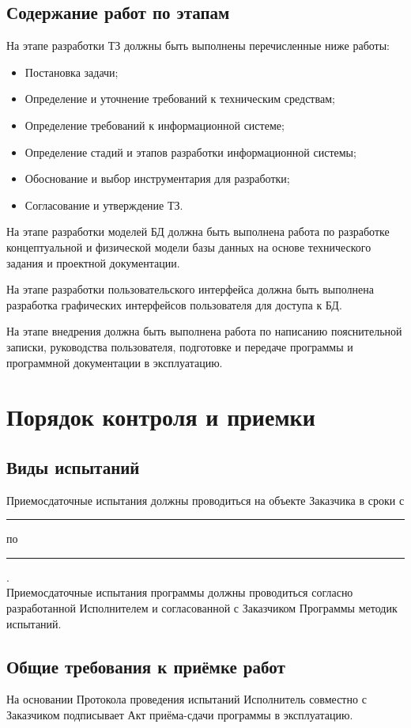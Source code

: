   \subsection{Содержание работ по этапам}
    На этапе разработки ТЗ должны быть выполнены перечисленные ниже работы:
      \begin{itemize}
        \item Постановка задачи;
        \item Определение и уточнение требований к техническим средствам;
        \item Определение требований к информационной системе;
        \item Определение стадий и этапов разработки информационной системы;
        \item Обоснование и выбор инструментария для разработки;
        \item Согласование и утверждение ТЗ.
      \end{itemize}
        
    На этапе разработки моделей БД должна быть выполнена работа по разработке концептуальной и физической модели базы данных на основе технического задания и проектной документации.

    На этапе разработки пользовательского интерфейса должна быть выполнена разработка графических интерфейсов пользователя для доступа к БД.

    На этапе внедрения должна быть выполнена работа по написанию пояснительной записки, руководства пользователя, подготовке и передаче программы и программной документации в эксплуатацию.
\section{Порядок контроля и приемки}
  \subsection{Виды испытаний}
    Приемосдаточные испытания должны проводиться на объекте Заказчика в сроки с \rule{2cm}{.1pt} по \rule{2cm}{.1pt}  .\\
    Приемосдаточные испытания программы должны проводиться согласно разработанной Исполнителем и согласованной с Заказчиком Программы методик испытаний.
  \subsection{Общие требования к приёмке работ}
    На основании Протокола проведения испытаний Исполнитель совместно с Заказчиком подписывает Акт приёма-сдачи программы в эксплуатацию.
\endinput
